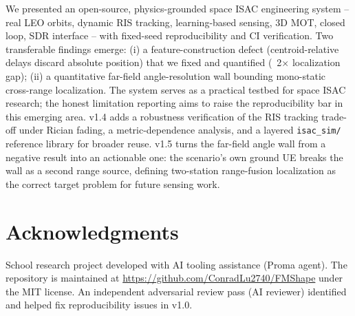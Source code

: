 \documentclass[11pt]{article}
\begin{document}
We presented an open-source, physics-grounded space ISAC engineering system -- real LEO orbits, dynamic RIS tracking, learning-based sensing, 3D MOT, closed loop, SDR interface -- with fixed-seed reproducibility and CI verification. Two transferable findings emerge: (i) a feature-construction defect (centroid-relative delays discard absolute position) that we fixed and quantified (~2$\times$ localization gap); (ii) a quantitative far-field angle-resolution wall bounding mono-static cross-range localization. The system serves as a practical testbed for space ISAC research; the honest limitation reporting aims to raise the reproducibility bar in this emerging area. v1.4 adds a robustness verification of the RIS tracking trade-off under Rician fading, a metric-dependence analysis, and a layered \texttt{isac\_sim/} reference library for broader reuse. v1.5 turns the far-field angle wall from a negative result into an actionable one: the scenario's own ground UE breaks the wall as a second range source, defining two-station range-fusion localization as the correct target problem for future sensing work.


\section{Acknowledgments}

School research project developed with AI tooling assistance (Proma agent). The repository is maintained at \href{https://github.com/ConradLu2740/FMShape}{https://github.com/ConradLu2740/FMShape} under the MIT license. An independent adversarial review pass (AI reviewer) identified and helped fix reproducibility issues in v1.0.
\end{document}
